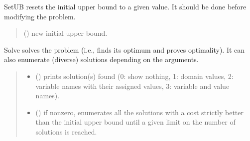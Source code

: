 \documentclass[letterpaper,10pt,openany,oneside,english]{sphinxmanual}
\begin{document}
\begin{fulllineitems}
\begin{fulllineitems}
\end{fulllineitems}


\begin{fulllineitems}
\label{\detokenize{ref/ref_python:pytoulbar2.CFN.SetUB}}
\pysigstartsignatures
{}
\pysigstopsignatures
\sphinxAtStartPar
SetUB resets the initial upper bound to a given value. It should be done before modifying the problem.
\begin{quote}\begin{description}
\sphinxAtStartPar
{} () \textendash{} new initial upper bound.

\end{description}\end{quote}

\end{fulllineitems}


\begin{fulllineitems}
\label{\detokenize{ref/ref_python:pytoulbar2.CFN.Solve}}
\pysigstartsignatures
{}
\pysigstopsignatures
\sphinxAtStartPar
Solve solves the problem (i.e., finds its optimum and proves optimality). It can also enumerate (diverse) solutions depending on the arguments.
\begin{quote}\begin{description}
\begin{itemize}
\item {} 
\sphinxAtStartPar
{} () \textendash{} prints solution(s) found (0: show nothing, 1: domain values, 2: variable names with their assigned values,
3: variable and value names).

\item {} 
\sphinxAtStartPar
{} () \textendash{} if non\sphinxhyphen{}zero, enumerates all the solutions with a cost strictly better than the initial upper bound
until a given limit on the number of solutions is reached.


\end{itemize}
\end{description}
\end{quote}
\end{fulllineitems}
\end{fulllineitems}
\end{document}

